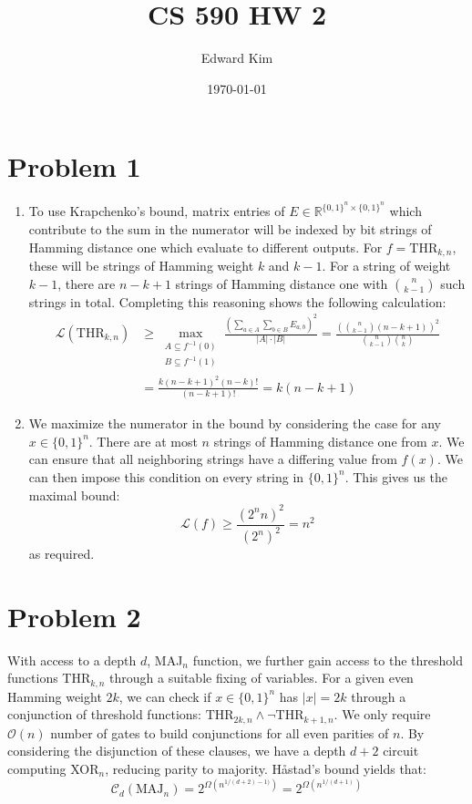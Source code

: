 \documentclass[12pt]{article}%
\begin{document}
\title{CS 590 HW 2}
\author{Edward Kim}
\date{\today}
\maketitle

\section{Problem 1}
\begin{enumerate}
  \item To use Krapchenko's bound, matrix entries of $E \in \mathbb{R}^{\{0,1\}^n \times \{0,1\}^n}$ which contribute to the sum in the numerator will be indexed by bit strings of Hamming distance one which evaluate to different outputs. For $f=\text{THR}_{k,n}$, these will be strings of Hamming weight $k$ and $k-1$. For a string of weight $k-1$, there are $n-k+1$ strings of Hamming distance one with ${n \choose k-1}$ such strings in total. Completing this reasoning shows the following calculation:
  \begin{align*}
    \mathcal{L}(\text{THR}_{k,n})
    & \geq \max_{\substack{A \subseteq f^{-1}(0) \\ B \subseteq f^{-1}(1)}} \frac{(\sum_{a \in A} \sum_{b \in B} E_{a,b})^2}{|A|\cdot |B|} = \frac{\left( {n \choose k  -1} (n-k + 1) \right)^2}{{n \choose k  -1}{n \choose k }} \\
    & = \frac{k (n - k + 1)^2(n-k)!}{(n-k+1)!} = k(n -k + 1)
  \end{align*}
  \item We maximize the numerator in the bound by considering the case for any $x \in \{0,1\}^n$. There are at most $n$ strings of Hamming distance one from $x$.  We can ensure that all neighboring strings have a differing value from $f(x)$. We can then impose this condition on every string in $\{0,1\}^n$. This gives us the maximal bound:
  $$ \mathcal{L}(f) \geq \frac{(2^n n)^2}{(2^n)^2} = n^2 $$ as required.
\end{enumerate}

\section{Problem 2}
With access to a depth $d$, MAJ$_n$ function, we further gain access to the threshold functions THR$_{k,n}$ through a suitable fixing of variables. For a given even Hamming weight $2k$, we can check if  $x \in \{0,1\}^n$ has $|x| = 2k$ through a conjunction of threshold functions: $\text{THR}_{2k,n} \wedge \neg\text{THR}_{k+1,n}$. We only require $\mathcal{O}(n)$ number of gates to build conjunctions for all even parities of $n$. By considering the disjunction of these clauses, we have a depth $d+2$ circuit computing XOR$_n$, reducing parity to majority. H\aa stad's bound yields that:
$$ \mathcal{C}_d(\text{MAJ}_{n}) = 2^{\Omega(n^{1/(d+2)-1)})} = 2^{\Omega(n^{1/(d+1)})} $$
\end{document}
